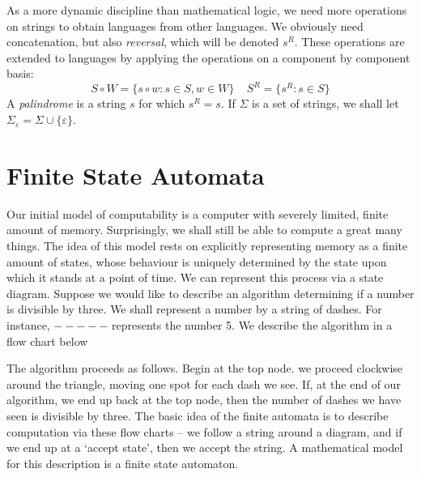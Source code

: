 As a more dynamic discipline than mathematical logic, we need more operations on strings to obtain languages from other languages. We obviously need concatenation, but also \emph{reversal}, which will be denoted $s^R$. These operations are extended to languages by applying the operations on a component by component basis:
%
\[ S \circ W = \{ s \circ w : s \in S, w \in W \}\ \ \ \ \ S^R = \{ s^R : s \in S \} \]
%
A \emph{palindrome} is a string $s$ for which $s^R = s$. If $\Sigma$ is a set of strings, we shall let $\Sigma_\varepsilon = \Sigma \cup \{ \varepsilon \}$.



\chapter{Finite State Automata}

Our initial model of computability is a computer with severely limited, finite amount of memory. Surprisingly, we shall still be able to compute a great many things. The idea of this model rests on explicitly representing memory as a finite amount of states, whose behaviour is uniquely determined by the state upon which it stands at a point of time. We can represent this process via a state diagram. Suppose we would like to describe an algorithm determining if a number is divisible by three. We shall represent a number by a string of dashes. For instance, $\mathsf{-----}$ represents the number 5. We describe the algorithm in a flow chart below
%
\begin{center}
\end{center}
%
The algorithm proceeds as follows. Begin at the top node. we proceed clockwise around the triangle, moving one spot for each dash we see. If, at the end of our algorithm, we end up back at the top node, then the number of dashes we have seen is divisible by three. The basic idea of the finite automata is to describe computation via these flow charts -- we follow a string around a diagram, and if we end up at a `accept state', then we accept the string. A mathematical model for this description is a finite state automaton.

